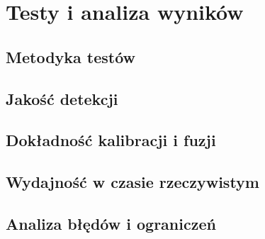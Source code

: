 \chapter{Testy i analiza wyników}
\label{chap:testy}

\section{Metodyka testów}
\label{sec:metodyka}

\section{Jakość detekcji}
\label{sec:jakosc-detekcji}

\section{Dokładność kalibracji i fuzji}
\label{sec:dokladnosc}

\section{Wydajność w czasie rzeczywistym}
\label{sec:wydajnosc}

\section{Analiza błędów i ograniczeń}
\label{sec:bledy}
